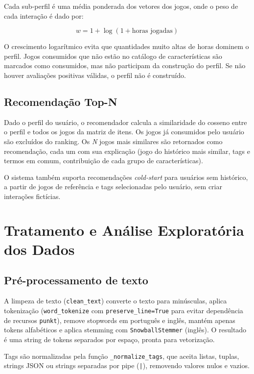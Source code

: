 \documentclass[12pt,a4paper]{article}
\begin{document}
Cada sub-perfil é uma média ponderada dos vetores dos jogos, onde o peso de cada interação é dado por:

\begin{equation}
    w = 1 + \log(1 + \text{horas jogadas})
\end{equation}

O crescimento logarítmico evita que quantidades muito altas de horas dominem o perfil. Jogos consumidos que não estão no catálogo de características são marcados como consumidos, mas não participam da construção do perfil. Se não houver avaliações positivas válidas, o perfil não é construído.

\subsection{Recomendação Top-N}

Dado o perfil do usuário, o recomendador calcula a similaridade do cosseno entre o perfil e todos os jogos da matriz de itens. Os jogos já consumidos pelo usuário são excluídos do ranking. Os \textit{N} jogos mais similares são retornados como recomendação, cada um com sua explicação (jogo do histórico mais similar, tags e termos em comum, contribuição de cada grupo de características).

O sistema também suporta recomendações \textit{cold-start} para usuários sem histórico, a partir de jogos de referência e tags selecionadas pelo usuário, sem criar interações fictícias.

\section{Tratamento e Análise Exploratória dos Dados}

\subsection{Pré-processamento de texto}

A limpeza de texto (\texttt{clean\_text}) converte o texto para minúsculas, aplica tokenização (\texttt{word\_tokenize} com \texttt{preserve\_line=True} para evitar dependência de recursos \texttt{punkt}), remove stopwords em português e inglês, mantém apenas tokens alfabéticos e aplica stemming com \texttt{SnowballStemmer} (inglês). O resultado é uma string de tokens separados por espaço, pronta para vetorização.

Tags são normalizadas pela função \texttt{\_normalize\_tags}, que aceita listas, tuplas, strings JSON ou strings separadas por pipe (\texttt{|}), removendo valores nulos e vazios.
\end{document}
